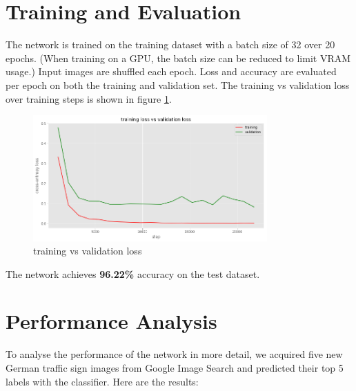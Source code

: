 \documentclass[]{article}
\begin{document}
\section{Training and Evaluation}

The network is trained on the training dataset with a batch size of 32 over 20 epochs. (When training on a GPU, the batch size can be reduced to limit VRAM usage.) Input images are shuffled each epoch. Loss and accuracy are evaluated per epoch on both the training and validation set. The training vs validation loss over training steps is shown in figure \ref{fig:loss}.

\begin{figure}[h]
	\centering
	\includegraphics[width=0.8\textwidth]{loss}
	\caption{training vs validation loss}
	\label{fig:loss}
\end{figure}

The network achieves \textbf{96.22\%} accuracy on the test dataset.

\section{Performance Analysis}

To analyse the performance of the network in more detail, we acquired five new German traffic sign images from Google Image Search and predicted their top 5 labels with the classifier. Here are the results:
\end{document}
